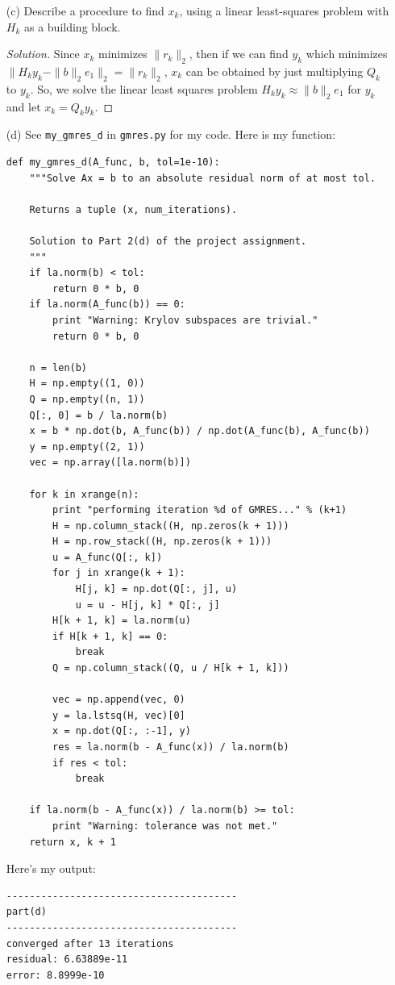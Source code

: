 \documentclass[10pt]{article}
\begin{document}
\begin{itemize}
\item[(c)] Describe a procedure to find $x_k$, using a linear least-squares problem with $H_k$ as a building block. 

\begin{proof}[Solution]
Since $ x_k $ minimizes $ \| r_k \|_2 $, then if we can find $ y_k $ which minimizes $\| H_k y_k - \| b \|_2 e_1 \|_2 = \| r_k \|_2$, $x_k$ can be obtained by just multiplying $ Q_k $ to $y_k$. So, we solve the linear least squares problem $
H_k y_k \approx \| b \|_2 e_1 $ for $y_k$ and let $ x_k = Q_k y_k $.
\end{proof}

\newpage

\item[(d)] See \verb+my_gmres_d+ in \verb+gmres.py+ for my code. Here is my function:  \begin{lstlisting}
def my_gmres_d(A_func, b, tol=1e-10):
    """Solve Ax = b to an absolute residual norm of at most tol.

    Returns a tuple (x, num_iterations).

    Solution to Part 2(d) of the project assignment.
    """
    if la.norm(b) < tol:
        return 0 * b, 0
    if la.norm(A_func(b)) == 0:
        print "Warning: Krylov subspaces are trivial."
        return 0 * b, 0

    n = len(b)
    H = np.empty((1, 0))
    Q = np.empty((n, 1))
    Q[:, 0] = b / la.norm(b)
    x = b * np.dot(b, A_func(b)) / np.dot(A_func(b), A_func(b))
    y = np.empty((2, 1))
    vec = np.array([la.norm(b)])

    for k in xrange(n):
        print "performing iteration %d of GMRES..." % (k+1)
        H = np.column_stack((H, np.zeros(k + 1)))
        H = np.row_stack((H, np.zeros(k + 1)))
        u = A_func(Q[:, k])
        for j in xrange(k + 1):
            H[j, k] = np.dot(Q[:, j], u)
            u = u - H[j, k] * Q[:, j]
        H[k + 1, k] = la.norm(u)
        if H[k + 1, k] == 0:
            break
        Q = np.column_stack((Q, u / H[k + 1, k]))

        vec = np.append(vec, 0)
        y = la.lstsq(H, vec)[0]
        x = np.dot(Q[:, :-1], y)
        res = la.norm(b - A_func(x)) / la.norm(b)
        if res < tol:
            break

    if la.norm(b - A_func(x)) / la.norm(b) >= tol:
        print "Warning: tolerance was not met."
    return x, k + 1
\end{lstlisting}

Here's my output: \begin{verbatim}
----------------------------------------
part(d)
----------------------------------------
converged after 13 iterations
residual: 6.63889e-11
error: 8.8999e-10
\end{verbatim}

\newpage



\end{itemize}
\end{document}

